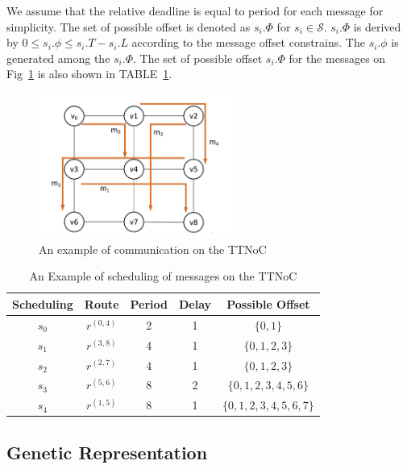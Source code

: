\documentclass[journal]{IEEEtran}
\newcommand{\calS}{\mathcal{S}}
\begin{document}
We assume that the relative deadline is equal to period for each message for simplicity.
The set of possible offset is denoted as $s_i.\Phi$ for $s_i\in\calS$.
$s_i.\Phi$ is derived by $ 0 \leq s_{i}.\phi \leq s_{i}.T - s_{i}.L $ according to the message offset constrains.
The $s_i.\phi$ is generated among the $s_i.\Phi$.
The set of possible offset $s_i.\Phi$ for the messages on Fig~\ref{f:comm_on_TTNoC} is also shown in TABLE~\ref{t:comm_info}.
\begin{figure}[!t]
	\centering
	\includegraphics[width=2.5in]{picture/scheduling_example.pdf}
	\caption{An example of communication on the TTNoC}
	\label{f:comm_on_TTNoC}
\end{figure}
\begin{table}[!t]
	\renewcommand{\arraystretch}{1.3}
	\caption{An Example of scheduling of messages on the TTNoC}
	\label{t:comm_info}
	\centering
	\begin{tabular}{|c||c||c||c||c|}
		\hline
			\textbf{Scheduling } & 
			\textbf{Route } & 
			\textbf{Period} & 
			\textbf{Delay } & 
			\textbf{Possible Offset}\\
		\hline
		$s_{0}$ & $ r^{(0,4)} $ & 2 & 1 & $\{0,1\}$\\
		\hline
		$s_{1}$ & $ r^{(3,8)} $ & 4 & 1 & $\{0,1,2,3\}$\\
		\hline
		$s_{2}$ & $ r^{(2,7) }$ & 4 & 1 & $\{0,1,2,3\}$\\
		\hline		
		$s_{3}$ & $ r^{(5,6) }$ & 8 & 2 & $\{0,1,2,3,4,5,6\}$\\
		\hline
		$s_{4}$ & $ r^{(1,5) }$ & 8 & 1 & $\{0,1,2,3,4,5,6,7\}$\\
		\hline		
	\end{tabular}
\end{table}
\subsection{Genetic Representation}
\end{document}
